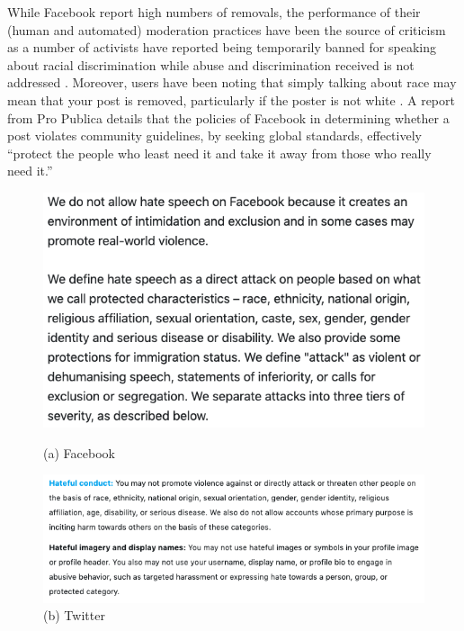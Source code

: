 While Facebook report high numbers of removals, the performance of their (human and automated) moderation practices have been the source of criticism as a number of activists have reported being temporarily banned for speaking about racial discrimination while abuse and discrimination received is not addressed \citep{Sharif:2019}.
Moreover, users have been noting that simply talking about race may mean that your post is removed, particularly if the poster is not white \citep{Guynn:2019}. A report from Pro Publica details that the policies of Facebook in determining whether a post violates community guidelines, by seeking global standards, effectively ``protect the people who least need it and take it away from those who really need it.''\citep{Angwin:2017}

\begin{figure}[!htb]
  \centering
  \begin{minipage}{0.45\textwidth}
    \includegraphics[width=\linewidth]{Chapter2/Figs/Facebook.png}
    \caption*{(a) Facebook}
  \end{minipage}\hfill
  \begin{minipage}{0.45\textwidth}
    \includegraphics[width=\linewidth]{Chapter2/Figs/Twitter.png}
    \caption*{(b) Twitter}
  \end{minipage}\hfill
\end{figure}

